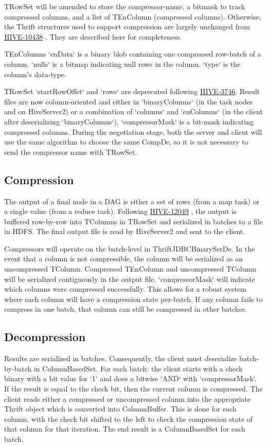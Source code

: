 \documentclass[11pt,a4paper]{article}
\begin{document}
		TRowSet will be amended to store the compressor-name, a bitmask to track compressed columns, and a list of TEnColumn (compressed columns).
		Otherwise, the Thrift structures used to support compression are largely unchanged from 
		\href{https://issues.apache.org/jira/browse/HIVE-10438}{HIVE-10438}
		. They are described here for completeness.
		
		TEnColumns `enData` is a binary blob containing one compressed row-batch of a column.
		`nulls` is a bitmap indicating null rows in the column.
		`type` is the column's data-type.
		
		TRowSet `startRowOffet` and `rows` are deprecated following \href{https://issues.apache.org/jira/browse/HIVE-3746}{HIVE-3746}.
		Result files are now column-oriented and either in `binaryColumns` (in the task nodes and on HiveServer2) or a combination of `columns` and `enColumns` (in the client after deserializing `binaryColumns`).
		`compressorMask` is a bit-mask indicating compressed columns.
		During the negotiation stage, both the server and client will use the same algorithm to choose the same CompDe, so it is not necessary to send the compressor name with TRowSet.
		
		\subsection{Compression}
		The output of a final node in a DAG is either a set of rows (from a map task) or a single value (from a reduce task).
		Following
		\href{https://issues.apache.org/jira/browse/HIVE-12049}{HIVE-12049}
		, the output is buffered row-by-row into TColumns in TRowSet and serialized in batches to a file in HDFS.
		The final output file is read by HiveServer2 and sent to the client.
		
		Compressors will operate on the batch-level in ThriftJDBCBinarySerDe.
		In the event that a column is not compressible, the column will be serialized as an uncompressed TColumn.
		Compressed TEnColumn and uncompressed TColumn will be serialized contiguously in the output file. `compressorMask` will indicate which columns were compressed successfully.
		This allows for a robust system where each column will have a compression state per-batch. If any column fails to compress in one batch, that column can still be compressed in other batches.
		
		\subsection{Decompression}
		Results are serialized in batches.
		Consequently, the client must deserialize batch-by-batch in ColumnBasedSet.
		For each batch: the client starts with a check binary with a bit value for `1` and does a bitwise `AND` with `compressorMask`.
		If the result is equal to the check bit, then the current column is compressed.
		The client reads either a compressed or uncompressed column into the appropriate Thrift object which is converted into ColumnBuffer.
		This is done for each column, with the check bit shifted to the left to check the compression state of that column for that iteration.
		The end result is a ColumnBasedSet for each batch.
		
\end{document}
